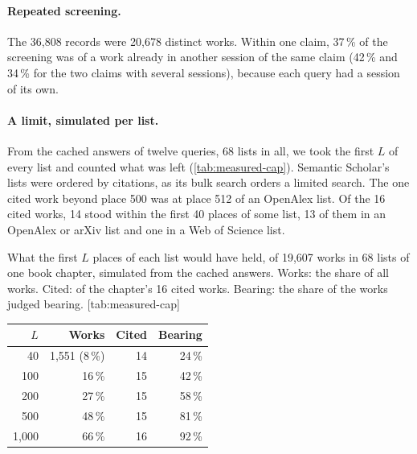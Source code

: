 \paragraph{Repeated screening.}
The 36,808 records were 20,678 distinct works.
Within one claim, 37\,\% of the screening was of a work already in
another session of the same claim (42\,\% and 34\,\% for the two claims
with several sessions), because each query had a session of its own.

\paragraph{A limit, simulated per list.}
From the cached answers of twelve queries, 68 lists in all, we took the
first $L$ of every list and counted what was left
(\cref{tab:measured-cap}).
Semantic Scholar's lists were ordered by citations, as its bulk search
orders a limited search.
The one cited work beyond place 500 was at place 512 of an OpenAlex
list.
Of the 16 cited works, 14 stood within the first 40 places of some
list, 13 of them in an OpenAlex or arXiv list and one in a Web of
Science list.

\begin{table}
  \begin{sidecaption}{%
      What the first $L$ places of each list would have held, of 19,607
      works in 68 lists of one book chapter, simulated from the cached
      answers.
      Works: the share of all works.
      Cited: of the chapter's 16 cited works.
      Bearing: the share of the works judged bearing.
    }[tab:measured-cap]
    \begin{tabular}{@{}rrrr@{}}
      \toprule
      $L$ & Works & Cited & Bearing \\
      \midrule
      40 & 1,551 (8\,\%) & 14 & 24\,\% \\
      100 & 16\,\% & 15 & 42\,\% \\
      200 & 27\,\% & 15 & 58\,\% \\
      500 & 48\,\% & 15 & 81\,\% \\
      1,000 & 66\,\% & 16 & 92\,\% \\
      \bottomrule
    \end{tabular}
  \end{sidecaption}
\end{table}


